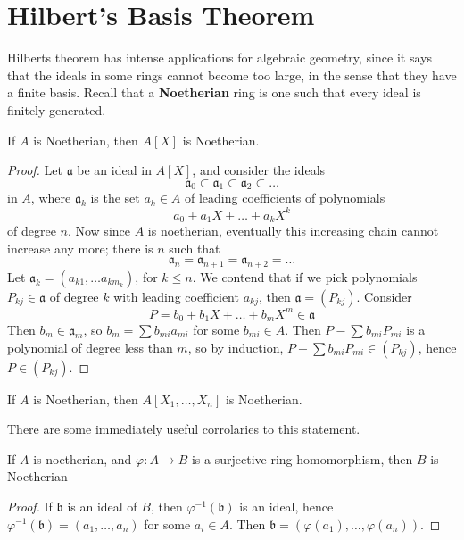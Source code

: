 \section{Hilbert's Basis Theorem}

Hilberts theorem has intense applications for algebraic geometry, since it says that the ideals in some rings cannot become too large, in the sense that they have a finite basis. Recall that a {\bf Noetherian} ring is one such that every ideal is finitely generated.

\begin{theorem}[Hilbert]
    If $A$ is Noetherian, then $A[X]$ is Noetherian.
\end{theorem}
\begin{proof}
    Let $\mathfrak{a}$ be an ideal in $A[X]$, and consider the ideals
    \[ \mathfrak{a}_0 \subset \mathfrak{a}_1 \subset \mathfrak{a}_2 \subset \dots \]
    in $A$, where $\mathfrak{a}_k$ is the set $a_k \in A$ of leading coefficients of polynomials
    \[ a_0 + a_1 X + \dots + a_k X^k \]
    of degree $n$. Now since $A$ is noetherian, eventually this increasing chain cannot increase any more; there is $n$ such that
    \[ \mathfrak{a}_n = \mathfrak{a}_{n+1} = \mathfrak{a}_{n+2} = \dots \]
    Let $\mathfrak{a}_k = (a_{k1}, \dots a_{km_k})$, for $k \leq n$. We contend that if we pick polynomials $P_{kj} \in \mathfrak{a}$ of degree $k$ with leading coefficient $a_{kj}$, then $\mathfrak{a} = (P_{kj})$. Consider
    \[ P = b_0 + b_1 X + \dots + b_m X^m \in \mathfrak{a} \]
    Then $b_m \in \mathfrak{a}_m$, so $b_m = \sum b_{mi} a_{mi}$ for some $b_{mi} \in A$. Then $P - \sum b_{mi} P_{mi}$ is a polynomial of degree less than $m$, so by induction, $P - \sum b_{mi} P_{mi} \in (P_{kj})$, hence $P \in (P_{kj})$.
\end{proof}

\begin{corollary}
    If $A$ is Noetherian, then $A[X_1, \dots, X_n]$ is Noetherian.
\end{corollary}

There are some immediately useful corrolaries to this statement.

\begin{lemma}
If $A$ is noetherian, and $\varphi: A \to B$ is a surjective ring homomorphism, then $B$ is Noetherian
\end{lemma}
\begin{proof}
    If $\mathfrak{b}$ is an ideal of $B$, then $\varphi^{-1}(\mathfrak{b})$ is an ideal, hence $\varphi^{-1}(\mathfrak{b}) = (a_1, \dots, a_n)$ for some $a_i \in A$. Then $\mathfrak{b} = (\varphi(a_1), \dots, \varphi(a_n))$.
\end{proof}

